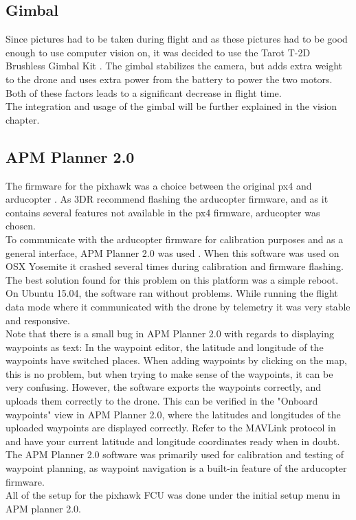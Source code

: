 \subsection*{Gimbal}
Since pictures had to be taken during flight and as these pictures had to be good enough to use
computer vision on, it was decided to use the Tarot T-2D Brushless Gimbal Kit \cite{Ref:Gimbal}. The
gimbal stabilizes the camera,
but adds extra weight to the drone and uses extra power from the battery to power the two
motors. Both of these factors leads to a significant decrease in flight time.\\
The integration and usage of the gimbal will be further explained in the vision chapter. 

\subsection*{APM Planner 2.0}
The firmware for the pixhawk was a choice between the original px4 and arducopter
\cite{Ref:Arducopter}. As 3DR recommend flashing the arducopter firmware, and as it contains several
features not available in the px4 firmware, arducopter was chosen.\\
To communicate with the arducopter firmware for calibration purposes and as a general interface,
APM Planner 2.0 was used \cite{Ref:APM2}.
When this software was used on OSX Yosemite it crashed several times
during calibration and firmware flashing. The best solution found for this problem on this platform
was a simple reboot. On Ubuntu 15.04, the software ran without problems.
While running the flight data mode where it communicated with the drone by
telemetry it was very stable and responsive.\\
Note that there is a small bug in APM Planner 2.0 with regards to displaying waypoints as text:
In the waypoint editor, the latitude and longitude of the waypoints have switched places. When adding
waypoints by clicking on the map, this is no problem, but when trying to make sense of the waypoints,
it can be very confusing. However, the software exports the waypoints correctly, and uploads them correctly to the drone.
This can be verified in the "Onboard waypoints" view in APM Planner 2.0, where the latitudes and longitudes of the uploaded
waypoints are displayed correctly.
Refer to the MAVLink protocol in \cite{Ref:MAVLink} and have your current latitude and longitude coordinates ready when in doubt.
The APM Planner 2.0 software was primarily used for calibration and testing of waypoint planning,
as waypoint navigation is a built-in feature of the arducopter firmware.\\
All of the setup for the pixhawk FCU was done under the initial setup menu in APM planner 2.0.

